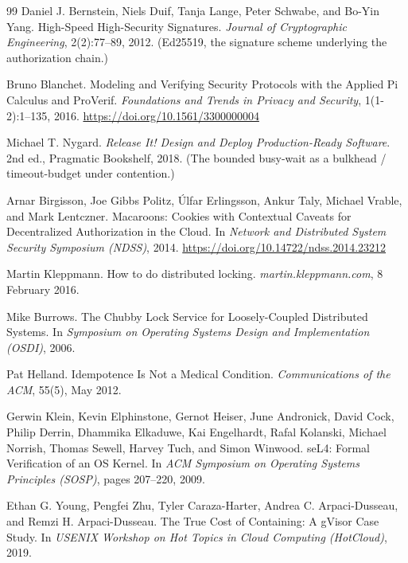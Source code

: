 \documentclass[11pt,a4paper]{article}
\theoremstyle{definition}
\theoremstyle{remark}
\begin{document}
\begin{thebibliography}{99}
Daniel J. Bernstein, Niels Duif, Tanja Lange, Peter Schwabe, and Bo-Yin Yang.
\newblock High-Speed High-Security Signatures.
\newblock \textit{Journal of Cryptographic Engineering}, 2(2):77--89, 2012.
\newblock (Ed25519, the signature scheme underlying the authorization chain.)

Bruno Blanchet.
\newblock Modeling and Verifying Security Protocols with the Applied Pi Calculus and ProVerif.
\newblock \textit{Foundations and Trends in Privacy and Security}, 1(1-2):1--135, 2016.
\newblock \url{https://doi.org/10.1561/3300000004}

Michael T. Nygard.
\newblock \textit{Release It! Design and Deploy Production-Ready Software}.
\newblock 2nd ed., Pragmatic Bookshelf, 2018.
\newblock (The bounded busy-wait as a bulkhead / timeout-budget under contention.)

Arnar Birgisson, Joe Gibbs Politz, Úlfar Erlingsson, Ankur Taly, Michael Vrable, and Mark Lentczner.
\newblock Macaroons: Cookies with Contextual Caveats for Decentralized Authorization in the Cloud.
\newblock In \textit{Network and Distributed System Security Symposium (NDSS)}, 2014.
\newblock \url{https://doi.org/10.14722/ndss.2014.23212}

Martin Kleppmann.
\newblock How to do distributed locking.
\newblock \textit{martin.kleppmann.com}, 8 February 2016.

Mike Burrows.
\newblock The Chubby Lock Service for Loosely-Coupled Distributed Systems.
\newblock In \textit{Symposium on Operating Systems Design and Implementation (OSDI)}, 2006.

Pat Helland.
\newblock Idempotence Is Not a Medical Condition.
\newblock \textit{Communications of the ACM}, 55(5), May 2012.

Gerwin Klein, Kevin Elphinstone, Gernot Heiser, June Andronick, David Cock, Philip Derrin, Dhammika Elkaduwe, Kai Engelhardt, Rafal Kolanski, Michael Norrish, Thomas Sewell, Harvey Tuch, and Simon Winwood.
\newblock seL4: Formal Verification of an OS Kernel.
\newblock In \textit{ACM Symposium on Operating Systems Principles (SOSP)}, pages 207--220, 2009.

Ethan G. Young, Pengfei Zhu, Tyler Caraza-Harter, Andrea C. Arpaci-Dusseau, and Remzi H. Arpaci-Dusseau.
\newblock The True Cost of Containing: A gVisor Case Study.
\newblock In \textit{USENIX Workshop on Hot Topics in Cloud Computing (HotCloud)}, 2019.


\end{thebibliography}
\end{document}
